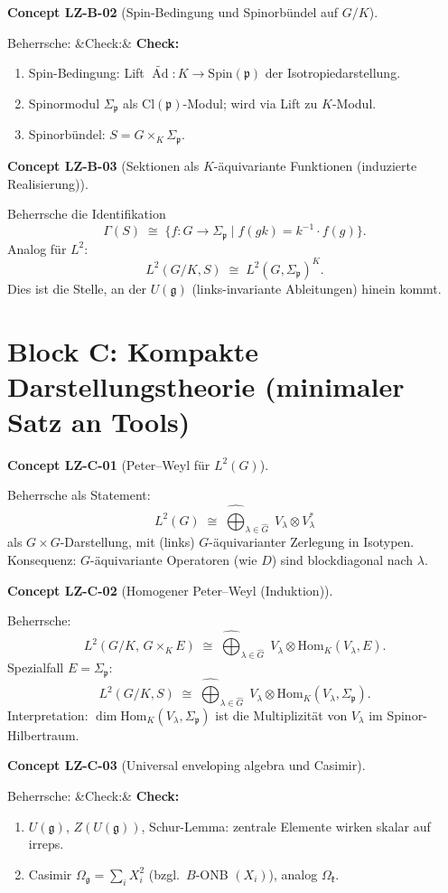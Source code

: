 \documentclass[10pt, letterpaper]{article}
\newcommand{\Ad}{\operatorname{Ad}}
\newcommand{\Hom}{\mathrm{Hom}}
\newcommand{\Cl}{\mathrm{Cl}}
\newcommand{\Spin}{\mathrm{Spin}}
\newenvironment{romanenum}[1][]
  {%
    \ifx&#1&
    \else
      \textbf{#1}\quad
    \fi
    \begin{enumerate}[label=\roman*)]
  }
  {%
    \end{enumerate}%
  }
\newcommand{\CustomHeading}[3]{%
  \par\medskip\noindent%
  \textbf{#1 #2} \textnormal{(#3)}.\enskip%
}
\newenvironment{CONC}[2]{\begin{unitbox}\CustomHeading{Concept}{#1}{#2}}{\end{unitbox}}
\begin{document}
\begin{CONC}{LZ-B-02}{Spin-Bedingung und Spinorb\"undel auf $G/K$}
Beherrsche:
\begin{romanenum}[Check:]
\item Spin-Bedingung: Lift $\widetilde{\Ad}:K\to \Spin(\mathfrak p)$ der Isotropiedarstellung.
\item Spinormodul $\Sigma_{\mathfrak p}$ als $\Cl(\mathfrak p)$-Modul; wird via Lift zu $K$-Modul.
\item Spinorb\"undel: $S=G\times_K \Sigma_{\mathfrak p}$.
\end{romanenum}
\end{CONC}

\begin{CONC}{LZ-B-03}{Sektionen als $K$-\"aquivariante Funktionen (induzierte Realisierung)}
Beherrsche die Identifikation
\[
\Gamma(S)\;\cong\;\{f:G\to\Sigma_{\mathfrak p}\mid f(gk)=k^{-1}\cdot f(g)\}.
\]
Analog f\"ur $L^2$:
\[
L^2(G/K,S)\;\cong\;L^2(G,\Sigma_{\mathfrak p})^{K}.
\]
Dies ist die Stelle, an der $U(\mathfrak g)$ (links-invariante Ableitungen) hinein kommt.
\end{CONC}

\section{Block C: Kompakte Darstellungstheorie (minimaler Satz an Tools)}

\begin{CONC}{LZ-C-01}{Peter--Weyl f\"ur $L^2(G)$}
Beherrsche als Statement:
\[
L^2(G)\;\cong\;\widehat{\bigoplus}_{\lambda\in\widehat G}\; V_\lambda\otimes V_\lambda^*
\]
als $G\times G$-Darstellung, mit (links) $G$-\"aquivarianter Zerlegung in Isotypen.
Konsequenz: $G$-\"aquivariante Operatoren (wie $D$) sind blockdiagonal nach $\lambda$.
\end{CONC}

\begin{CONC}{LZ-C-02}{Homogener Peter--Weyl (Induktion)}
Beherrsche:
\[
L^2(G/K,\,G\times_KE)
\;\cong\;
\widehat{\bigoplus}_{\lambda\in\widehat G}\;
V_\lambda\otimes \Hom_K(V_\lambda,E).
\]
Spezialfall $E=\Sigma_{\mathfrak p}$:
\[
L^2(G/K,S)
\;\cong\;
\widehat{\bigoplus}_{\lambda\in\widehat G}\;
V_\lambda\otimes \Hom_K(V_\lambda,\Sigma_{\mathfrak p}).
\]
Interpretation: $\dim\Hom_K(V_\lambda,\Sigma_{\mathfrak p})$ ist die Multiplizit\"at von $V_\lambda$ im Spinor-Hilbertraum.
\end{CONC}

\begin{CONC}{LZ-C-03}{Universal enveloping algebra und Casimir}
Beherrsche:
\begin{romanenum}[Check:]
\item $U(\mathfrak g)$, $Z(U(\mathfrak g))$, Schur-Lemma: zentrale Elemente wirken skalar auf irreps.
\item Casimir $\Omega_{\mathfrak g}=\sum_i X_i^2$ (bzgl.\ $B$-ONB $(X_i)$), analog $\Omega_{\mathfrak k}$.
\end{romanenum}
\end{CONC}
\end{document}
